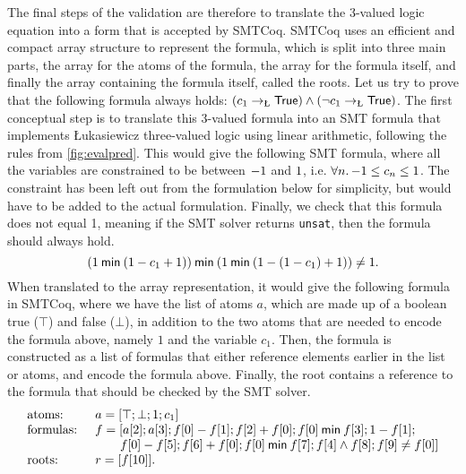 {The final steps of the validation are therefore to translate the 3-valued logic
equation into a form that is accepted by SMTCoq.  SMTCoq uses an efficient and
compact array structure to represent the formula, which is split into three main
parts, the array for the atoms of the formula, the array for the formula itself,
and finally the array containing the formula itself, called the roots.  Let us
try to prove that the following formula always holds:
$\syniteformulanslk{c_1}{\predtrue}{\predtrue}$.  The first conceptual step is
to translate this 3-valued formula into an SMT formula that implements
\L{}ukasiewicz three-valued logic using linear arithmetic, following the rules
from \cref{fig:evalpred}.  This would give the following SMT formula, where all
the variables are constrained to be between $-1$ and $1$, i.e.
$\forall n\ldotp -1 \leq c_n \leq 1$.  The constraint has been left
out from the formulation below for simplicity, but would have to be added to the
actual formulation.  Finally, we check that this formula does not equal 1,
meaning if the SMT solver returns \texttt{unsat}, then the formula should always
hold.
%
\begin{equation*}
  (1 \mathbin{\textsf{min}} (1 - c_1 + 1)) \mathbin{\textsf{min}} (1 \mathbin{\textsf{min}} (1 - (1 - c_1) + 1)) \neq 1.
\end{equation*}
%
When translated to the array representation, it would give the following formula
in SMTCoq, where we have the list of atoms $a$, which are made up of a boolean
true ($\top$) and false ($\bot$), in addition to the two atoms that are needed
to encode the formula above, namely $1$ and the variable $c_1$.  Then, the
formula is constructed as a list of formulas that either reference elements
earlier in the list or atoms, and encode the formula above.  Finally, the root
contains a reference to the formula that should be checked by the SMT solver.
%
\begin{equation*}
  \begin{array}{ll}
    \text{atoms: } & a = [\top; \bot; 1; c_1]\\
    \text{formulas: } & f = [a[2]; a[3]; f[0] - f[1]; f[2] + f[0]; f[0]
                        \mathbin{\textsf{min}} f[3]; 1 - f[1];\\
                   & \qquad f[0] - f[5]; f[6] + f[0]; f[0] \mathbin{\textsf{min}}
                     f[7]; f[4] \land f[8]; f[9] \neq f[0]]\\
    \text{roots: } & r = [f[10]].
  \end{array}
\end{equation*}

}

